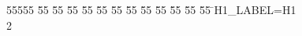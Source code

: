 %
%
\begin{tabbing}
55555 \= 55 \= 55 \= 55 \= 55 \= 55 \= 55 \= 55 \= 55 \= 55 \= 55 \= 55 \= 55 \= \>H1\_LABEL=H1\\[0pt]
2\>\end{tabbing}
